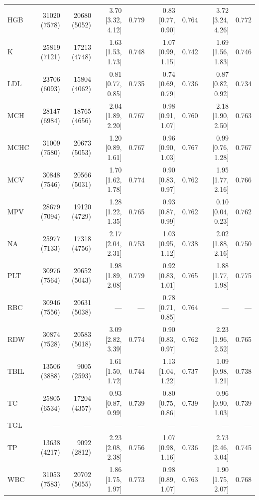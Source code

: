\begin{table}[ht]
\begin{tabular}{lrrrrrrrr}
HGB & 31020 (7578) & 20680 (5052) & 3.70 [3.32, 4.12] & 0.779 & 0.83 [0.77, 0.90] & 0.764 & 3.72 [3.24, 4.26] & 0.772 \\
K & 25819 (7121) & 17213 (4748) & 1.63 [1.53, 1.73] & 0.748 & 1.07 [0.99, 1.15] & 0.742 & 1.69 [1.56, 1.83] & 0.746 \\
LDL & 23706 (6093) & 15804 (4062) & 0.81 [0.77, 0.85] & 0.735 & 0.74 [0.69, 0.79] & 0.736 & 0.87 [0.82, 0.92] & 0.734 \\
MCH & 28147 (6984) & 18765 (4656) & 2.04 [1.89, 2.20] & 0.767 & 0.98 [0.91, 1.07] & 0.760 & 2.18 [1.90, 2.50] & 0.763 \\
MCHC & 31009 (7580) & 20673 (5053) & 1.20 [0.89, 1.61] & 0.767 & 0.96 [0.90, 1.03] & 0.767 & 0.99 [0.76, 1.28] & 0.767 \\
MCV & 30848 (7546) & 20566 (5031) & 1.70 [1.62, 1.78] & 0.774 & 0.90 [0.83, 0.97] & 0.762 & 1.95 [1.77, 2.16] & 0.766 \\
MPV & 28679 (7094) & 19120 (4729) & 1.28 [1.22, 1.35] & 0.765 & 0.93 [0.87, 0.99] & 0.762 & 0.10 [0.04, 0.23] & 0.762 \\
NA & 25977 (7133) & 17318 (4756) & 2.17 [2.04, 2.31] & 0.753 & 1.03 [0.95, 1.12] & 0.738 & 2.02 [1.88, 2.16] & 0.750 \\
PLT & 30976 (7564) & 20652 (5043) & 1.98 [1.89, 2.08] & 0.779 & 0.92 [0.83, 1.01] & 0.765 & 1.88 [1.77, 1.98] & 0.775 \\
RBC & 30946 (7556) & 20631 (5038) & --- & --- & 0.78 [0.71, 0.85] & 0.764 & --- & --- \\
RDW & 30874 (7528) & 20583 (5018) & 3.09 [2.82, 3.39] & 0.774 & 0.90 [0.83, 0.97] & 0.762 & 2.23 [1.96, 2.52] & 0.765 \\
TBIL & 13506 (3888) & 9005 (2593) & 1.61 [1.50, 1.72] & 0.744 & 1.13 [1.04, 1.22] & 0.737 & 1.09 [0.98, 1.21] & 0.738 \\
TC & 25805 (6534) & 17204 (4357) & 0.93 [0.87, 0.99] & 0.739 & 0.80 [0.75, 0.86] & 0.739 & 0.96 [0.90, 1.03] & 0.739 \\
TGL & --- & --- & --- & --- & --- & --- & --- & --- \\
TP & 13638 (4217) & 9092 (2812) & 2.23 [2.08, 2.38] & 0.756 & 1.07 [0.98, 1.16] & 0.736 & 2.73 [2.46, 3.04] & 0.745 \\
WBC & 31053 (7583) & 20702 (5055) & 1.86 [1.75, 1.97] & 0.773 & 0.98 [0.89, 1.07] & 0.763 & 1.90 [1.75, 2.07] & 0.768 \\
\bottomrule
\end{tabular}
\label{tab:chs_cox_mortality}
\end{table}